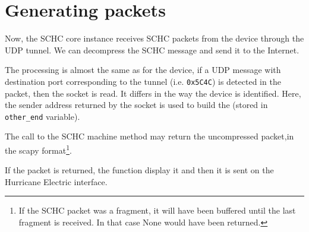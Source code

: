 \section{Generating packets}

Now, the SCHC core instance receives SCHC packets from the device through the UDP tunnel. We can decompress the SCHC message and send it to the Internet.


The processing is almost the same as for the device, if a UDP message with destination port corresponding to the tunnel (i.e. \texttt{0x5C4C}) is detected in the packet, then the socket is read. It differs in the way the device is identified. Here, the sender address returned by the socket is used to build the  (stored in \texttt{other\_end} variable). 

The call to the SCHC machine  method may return the uncompressed packet,in the scapy format\footnote{If the SCHC packet was a fragment, it will have been buffered until the last fragment is received. In that case None would have been returned.}. 

If the packet is returned, the  function display it and then it is sent on the Hurricane Electric interface.


